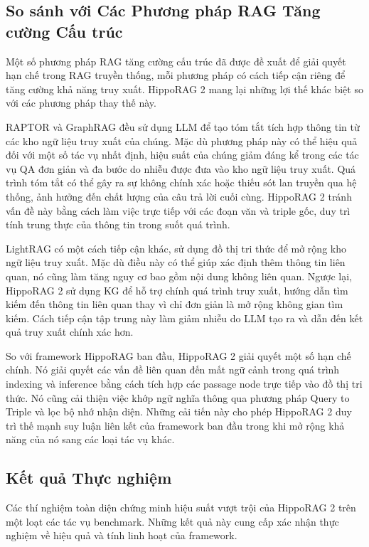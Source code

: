 \documentclass[../main.tex]{subfiles}
\begin{document}
\subsection{So sánh với Các Phương pháp RAG Tăng cường Cấu trúc}
Một số phương pháp RAG tăng cường cấu trúc đã được đề xuất để giải quyết hạn chế trong RAG truyền thống, mỗi phương pháp có cách tiếp cận riêng để tăng cường khả năng truy xuất. HippoRAG 2 mang lại những lợi thế khác biệt so với các phương pháp thay thế này.

RAPTOR và GraphRAG đều sử dụng LLM để tạo tóm tắt tích hợp thông tin từ các kho ngữ liệu truy xuất của chúng. Mặc dù phương pháp này có thể hiệu quả đối với một số tác vụ nhất định, hiệu suất của chúng giảm đáng kể trong các tác vụ QA đơn giản và đa bước do nhiễu được đưa vào kho ngữ liệu truy xuất. Quá trình tóm tắt có thể gây ra sự không chính xác hoặc thiếu sót lan truyền qua hệ thống, ảnh hưởng đến chất lượng của câu trả lời cuối cùng. HippoRAG 2 tránh vấn đề này bằng cách làm việc trực tiếp với các đoạn văn và triple gốc, duy trì tính trung thực của thông tin trong suốt quá trình.

LightRAG có một cách tiếp cận khác, sử dụng đồ thị tri thức để mở rộng kho ngữ liệu truy xuất. Mặc dù điều này có thể giúp xác định thêm thông tin liên quan, nó cũng làm tăng nguy cơ bao gồm nội dung không liên quan. Ngược lại, HippoRAG 2 sử dụng KG để hỗ trợ chính quá trình truy xuất, hướng dẫn tìm kiếm đến thông tin liên quan thay vì chỉ đơn giản là mở rộng không gian tìm kiếm. Cách tiếp cận tập trung này làm giảm nhiễu do LLM tạo ra và dẫn đến kết quả truy xuất chính xác hơn.

So với framework HippoRAG ban đầu, HippoRAG 2 giải quyết một số hạn chế chính. Nó giải quyết các vấn đề liên quan đến mất ngữ cảnh trong quá trình indexing và inference bằng cách tích hợp các passage node trực tiếp vào đồ thị tri thức. Nó cũng cải thiện việc khớp ngữ nghĩa thông qua phương pháp Query to Triple và lọc bộ nhớ nhận diện. Những cải tiến này cho phép HippoRAG 2 duy trì thế mạnh suy luận liên kết của framework ban đầu trong khi mở rộng khả năng của nó sang các loại tác vụ khác.

\subsection{Kết quả Thực nghiệm}
Các thí nghiệm toàn diện chứng minh hiệu suất vượt trội của HippoRAG 2 trên một loạt các tác vụ benchmark. Những kết quả này cung cấp xác nhận thực nghiệm về hiệu quả và tính linh hoạt của framework.
\end{document}
